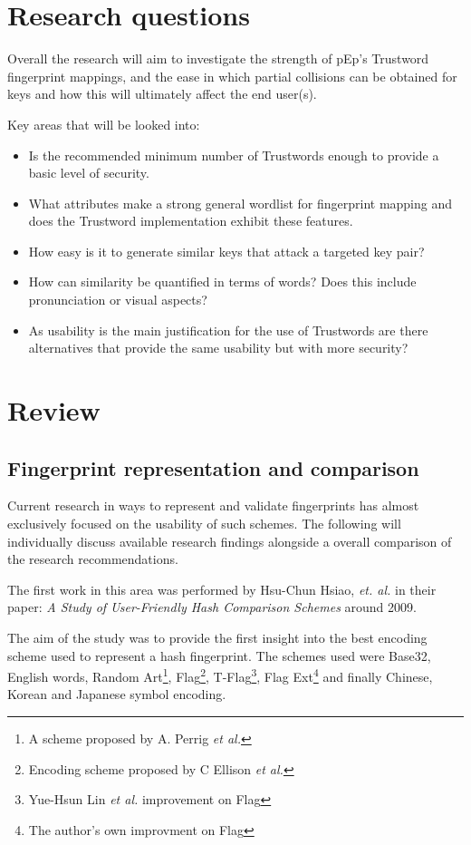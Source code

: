 \section{Research questions}

Overall the research will aim to investigate the strength of pEp's Trustword fingerprint mappings, and the ease in which partial collisions can be obtained for keys and how this will ultimately affect the end user(s).

Key areas that will be looked into:
\begin{itemize}
    \item Is the recommended minimum number of Trustwords enough to provide a basic level of security.
    \item What attributes make a strong general wordlist for fingerprint mapping and does the Trustword implementation exhibit these features.
    \item How easy is it to generate similar keys that attack a targeted key pair?
    \item How can similarity be quantified in terms of words? Does this include pronunciation or visual aspects?
    \item As usability is the main justification for the use of Trustwords are there alternatives that provide the same usability but with more security?
\end{itemize}

\section{Review}

\subsection{Fingerprint representation and comparison}

Current research in ways to represent and validate fingerprints has almost exclusively focused on the usability of such schemes. The following will individually discuss available research findings alongside a overall comparison of the research recommendations.

The first work in this area was performed by Hsu-Chun Hsiao, \textit{et. al.} in their paper: \textit{A Study of User-Friendly Hash Comparison Schemes}\cite{hsiao2009study} around 2009.

The aim of the study was to provide the first insight into the best encoding scheme used to represent a hash fingerprint. The schemes used were Base32, English words, Random Art\footnote{A scheme proposed by A. Perrig \textit{et al.}\cite{perrig1999hash}}, Flag\footnote{Encoding scheme proposed by C Ellison \textit{et al.}\cite{ellison2003public}}, T-Flag\footnote{Yue-Hsun Lin \textit{et al.}\cite{lin2010spate} improvement on Flag}, Flag Ext\footnote{The author's own improvment on Flag} and finally Chinese, Korean and Japanese symbol encoding.

